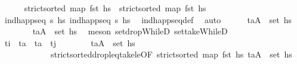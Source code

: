 \begin{isabellebody}
\ \ \ \ \isamarkupfalse%
\ {\isachardoublequoteopen}strict{\isacharunderscore}{\kern0pt}sorted\ {\isacharparenleft}{\kern0pt}map\ fst\ hs\ \ {\isachardoublequoteopen}strict{\isacharunderscore}{\kern0pt}sorted\ {\isacharparenleft}{\kern0pt}map\ fst\ hs\isanewline
\ \ \ \ \ \ \isamarkupfalse%
\ {\isacartoucheopen}ind{\isacharunderscore}{\kern0pt}happ{\isacharunderscore}{\kern0pt}seq\ {\isasympi}s\ hs\ {\isacartoucheopen}ind{\isacharunderscore}{\kern0pt}happ{\isacharunderscore}{\kern0pt}seq\ {\isasympi}s\ hs\ \isamarkupfalse%
\ ind{\isacharunderscore}{\kern0pt}happ{\isacharunderscore}{\kern0pt}seq{\isacharunderscore}{\kern0pt}def\ \isamarkupfalse%
\ auto\isanewline
\ \ \ \ \isamarkupfalse%
\ {\isachardoublequoteopen}{\isacharparenleft}{\kern0pt}t\isactrlsub a{\isacharcomma}{\kern0pt}A{\isacharparenright}{\kern0pt}\ {\isasymin}\ set\ hs\isanewline
\ \ \ \ \ \ \isamarkupfalse%
\ {\isacartoucheopen}{\isacharparenleft}{\kern0pt}t\isactrlsub a{\isacharcomma}{\kern0pt}A{\isacharparenright}{\kern0pt}\ {\isasymin}\ set\ {\isacharquery}{\kern0pt}hs\ \isamarkupfalse%
\ {\isacharparenleft}{\kern0pt}meson\ set{\isacharunderscore}{\kern0pt}dropWhileD\ set{\isacharunderscore}{\kern0pt}takeWhileD{\isacharparenright}{\kern0pt}\ \isanewline
\ \ \ \ \isamarkupfalse%
\ {\isachardoublequoteopen}t\isactrlsub i\ {\isacharless}{\kern0pt}\ t\isactrlsub a\ {\isasymand}\ t\isactrlsub a\ {\isacharless}{\kern0pt}\ t\isactrlsub j{\isachardoublequoteclose}\isanewline
\ \ \ \ \ \ \isamarkupfalse%
\ {\isacartoucheopen}{\isacharparenleft}{\kern0pt}t\isactrlsub a{\isacharcomma}{\kern0pt}A{\isacharparenright}{\kern0pt}\ {\isasymin}\ set\ {\isacharquery}{\kern0pt}hs\isanewline
\ \ \ \ \ \ \ \ \ \ \ \ strict{\isacharunderscore}{\kern0pt}sorted{\isacharunderscore}{\kern0pt}drop{\isacharunderscore}{\kern0pt}leq{\isacharunderscore}{\kern0pt}take{\isacharunderscore}{\kern0pt}le{\isacharbrackleft}{\kern0pt}OF\ {\isacartoucheopen}strict{\isacharunderscore}{\kern0pt}sorted\ {\isacharparenleft}{\kern0pt}map\ fst\ hs\ {\isacartoucheopen}{\isacharparenleft}{\kern0pt}t\isactrlsub a{\isacharcomma}{\kern0pt}A{\isacharparenright}{\kern0pt}\ {\isasymin}\ set\ hs\isanewline

\end{isabellebody}
